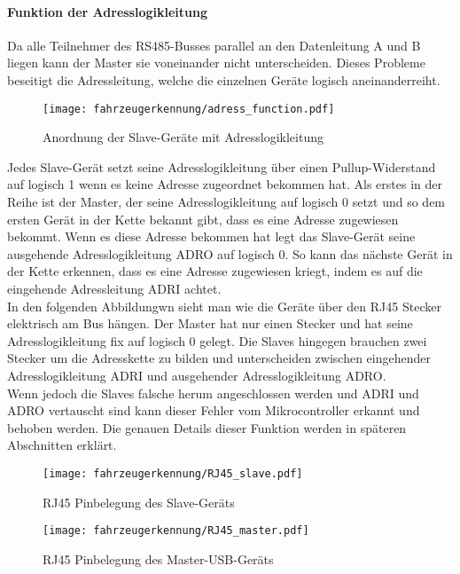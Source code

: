 \paragraph{Funktion der Adresslogikleitung}\mbox{}

Da alle Teilnehmer des RS485-Busses parallel an den Datenleitung A und B liegen kann der Master sie voneinander nicht unterscheiden. Dieses Probleme beseitigt die Adressleitung, welche
die einzelnen Geräte logisch aneinanderreiht.

\begin{figure}[H]
    \centering
    \texttt{[image: fahrzeugerkennung/adress\_function.pdf]}
    \caption{Anordnung der Slave-Geräte mit Adresslogikleitung}
\end{figure}

Jedes Slave-Gerät setzt seine Adresslogikleitung über einen Pullup-Widerstand auf logisch 1 wenn es keine Adresse zugeordnet bekommen hat.
Als erstes in der Reihe ist der Master, der seine Adresslogikleitung auf logisch 0 setzt und so dem ersten Gerät in der Kette bekannt gibt, dass es eine Adresse zugewiesen bekommt. Wenn es
diese Adresse bekommen hat legt das Slave-Gerät seine ausgehende Adresslogikleitung ADRO auf logisch 0. So kann das nächste Gerät in der Kette erkennen, dass es eine Adresse zugewiesen kriegt, 
indem es auf die eingehende Adressleitung ADRI achtet.\\
In den folgenden Abbildungwn sieht man wie die Geräte über den RJ45 Stecker elektrisch am Bus hängen. Der Master hat nur einen Stecker und hat seine Adresslogikleitung fix auf logisch 0 gelegt.
Die Slaves hingegen brauchen zwei Stecker um die Adresskette zu bilden und unterscheiden zwischen eingehender Adresslogikleitung ADRI und ausgehender Adresslogikleitung ADRO. \\
Wenn jedoch die Slaves falsche herum angeschlossen werden und ADRI und ADRO vertauscht sind kann dieser Fehler vom Mikrocontroller erkannt und behoben werden. Die genauen Details dieser Funktion 
werden in späteren Abschnitten erklärt. 

\begin{figure}[H]
    \centering
    \texttt{[image: fahrzeugerkennung/RJ45\_slave.pdf]}
    \caption{RJ45 Pinbelegung des Slave-Geräts}
\end{figure}

\begin{figure}[H]
    \centering
    \texttt{[image: fahrzeugerkennung/RJ45\_master.pdf]}
    \caption{RJ45 Pinbelegung des Master-USB-Geräts}
\end{figure}

